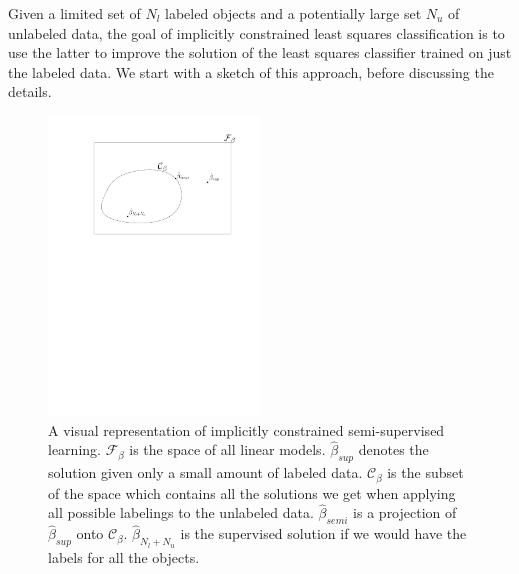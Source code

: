 \documentclass[smallcondensed]{svjour3}
\begin{document}
Given a limited set of $N_l$ labeled objects and a potentially large set $N_u$ of unlabeled data, the goal of implicitly constrained least squares classification is to use the latter to improve the solution of the least squares classifier trained on just the labeled data. We start with a sketch of this approach, before discussing the details.

\begin{figure}[h] 
  \centering
      \includegraphics[width=0.5\textwidth]{constrainedspace.pdf}
  \caption{A visual representation of implicitly constrained semi-supervised learning. $\mathcal{F}_{\beta}$ is the space of all linear models. $\hat{\beta}_{sup}$ denotes the solution given only a small amount of labeled data. $\mathcal{C}_{\beta}$ is the subset of the space which contains all the solutions we get when applying all possible labelings to the unlabeled data. $\hat{\beta}_{semi}$ is a projection of $\hat{\beta}_{sup}$ onto $\mathcal{C}_{\beta}$. $\hat{\beta}_{N_l+N_u}$ is the supervised solution if we would have the labels for all the objects.} \label{fig:constrainedsubset}
\end{figure}
\end{document}
